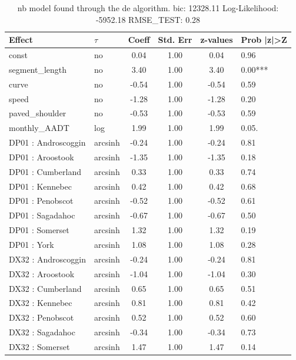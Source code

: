 \begin{table}
	\caption{nb model found through the de algorithm. bic: 12328.11 Log-Likelihood: -5952.18 RMSE_TEST: 0.28}
	\begin{center}
		\begin{tabular}{|l|l|c|c|c|l|}
			\hline
			Effect & $\tau$ & Coeff & Std. Err & z-values & Prob |z|>Z \\
			\hline
			const & no & 0.04 & 1.00 & 0.04 & 0.96 \\
			\hline
			segment_length & no & 3.40 & 1.00 & 3.40 & 0.00*** \\
			\hline
			curve & no & -0.54 & 1.00 & -0.54 & 0.59 \\
			\hline
			speed & no & -1.28 & 1.00 & -1.28 & 0.20 \\
			\hline
			paved_shoulder & no & -0.53 & 1.00 & -0.53 & 0.59 \\
			\hline
			monthly_AADT & log & 1.99 & 1.00 & 1.99 & 0.05. \\
			\hline
			DP01 : Androscoggin & arcsinh & -0.24 & 1.00 & -0.24 & 0.81 \\
			\hline
			DP01 : Aroostook & arcsinh & -1.35 & 1.00 & -1.35 & 0.18 \\
			\hline
			DP01 : Cumberland & arcsinh & 0.33 & 1.00 & 0.33 & 0.74 \\
			\hline
			DP01 : Kennebec & arcsinh & 0.42 & 1.00 & 0.42 & 0.68 \\
			\hline
			DP01 : Penobscot & arcsinh & -0.52 & 1.00 & -0.52 & 0.61 \\
			\hline
			DP01 : Sagadahoc & arcsinh & -0.67 & 1.00 & -0.67 & 0.50 \\
			\hline
			DP01 : Somerset & arcsinh & 1.32 & 1.00 & 1.32 & 0.19 \\
			\hline
			DP01 : York & arcsinh & 1.08 & 1.00 & 1.08 & 0.28 \\
			\hline
			DX32 : Androscoggin & arcsinh & -0.24 & 1.00 & -0.24 & 0.81 \\
			\hline
			DX32 : Aroostook & arcsinh & -1.04 & 1.00 & -1.04 & 0.30 \\
			\hline
			DX32 : Cumberland & arcsinh & 0.65 & 1.00 & 0.65 & 0.51 \\
			\hline
			DX32 : Kennebec & arcsinh & 0.81 & 1.00 & 0.81 & 0.42 \\
			\hline
			DX32 : Penobscot & arcsinh & 0.52 & 1.00 & 0.52 & 0.60 \\
			\hline
			DX32 : Sagadahoc & arcsinh & -0.34 & 1.00 & -0.34 & 0.73 \\
			\hline
			DX32 : Somerset & arcsinh & 1.47 & 1.00 & 1.47 & 0.14 \\

\end{tabular}
\end{center}
\end{table}
